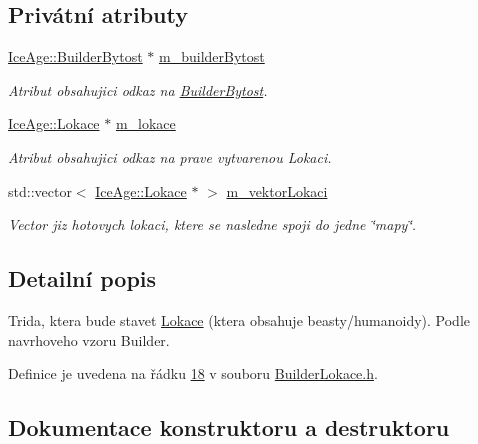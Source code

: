 \subsection*{Privátní atributy}
\begin{DoxyCompactItemize}
\item 
\hyperlink{classIceAge_1_1BuilderBytost}{Ice\+Age\+::\+Builder\+Bytost} $\ast$ \hyperlink{classIceAge_1_1BuilderLokace_ac6981c43c22713d56e7ccbefa8b5c8b4}{m\+\_\+builder\+Bytost}
\begin{DoxyCompactList}\small\item\em Atribut obsahujici odkaz na \hyperlink{classIceAge_1_1BuilderBytost}{Builder\+Bytost}. \end{DoxyCompactList}\item 
\hyperlink{classIceAge_1_1Lokace}{Ice\+Age\+::\+Lokace} $\ast$ \hyperlink{classIceAge_1_1BuilderLokace_aad0fb17bf38c03cd767e100758348f24}{m\+\_\+lokace}
\begin{DoxyCompactList}\small\item\em Atribut obsahujici odkaz na prave vytvarenou Lokaci. \end{DoxyCompactList}\item 
std\+::vector$<$ \hyperlink{classIceAge_1_1Lokace}{Ice\+Age\+::\+Lokace} $\ast$ $>$ \hyperlink{classIceAge_1_1BuilderLokace_a110ada142d159f68fb82382a47d088f4}{m\+\_\+vektor\+Lokaci}
\begin{DoxyCompactList}\small\item\em Vector jiz hotovych lokaci, ktere se nasledne spoji do jedne \char`\"{}mapy\char`\"{}. \end{DoxyCompactList}\end{DoxyCompactItemize}


\subsection{Detailní popis}
Trida, ktera bude stavet \hyperlink{classIceAge_1_1Lokace}{Lokace} (ktera obsahuje beasty/humanoidy). Podle navrhoveho vzoru Builder. 

Definice je uvedena na řádku \hyperlink{BuilderLokace_8h_source_l00018}{18} v souboru \hyperlink{BuilderLokace_8h_source}{Builder\+Lokace.\+h}.



\subsection{Dokumentace konstruktoru a destruktoru}
